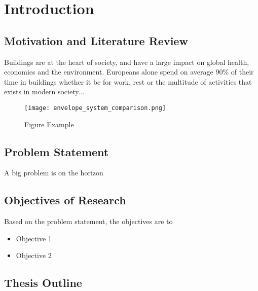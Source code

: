 
\chapter{Introduction}
\label{ch:introduction}



\section{Motivation and Literature Review}
\label{ch:motivation}

Buildings are at the heart of society, and have a large impact on global health, economics and the environment. Europeans alone spend on average 90\% of their time in buildings \cite{Staniaszek2014BPIE} whether it be for work, rest or the multitude of activities that exists in modern society...\\

  \begin{figure}[ht] %
    \begin{center}
      \texttt{[image: envelope\_system\_comparison.png]}
      \caption{Figure Example}
      \label{fig: comparison}
    \end{center} 
  \end{figure}

 
\section{Problem Statement}
A big problem is on the horizon


\section{Objectives of Research}

Based on the problem statement, the objectives are to

\begin{itemize}
	\item Objective 1
	\item Objective 2
\end{itemize}


\section{Thesis Outline}


